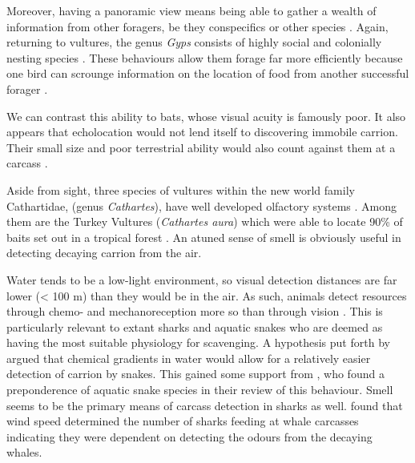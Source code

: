 \documentclass[a4paper,12pt]{article}
\begin{document}
Moreover, having a panoramic view means being able to gather a wealth of information from other foragers, be they conspecifics or other species \citep{jackson2008effect}.
Again, returning to vultures, the genus \textit{Gyps} consists of highly social and colonially nesting species \citep{fernandez2015density}.
These behaviours allow them forage far more efficiently because one bird can scrounge information on the location of food from another successful forager \citep{KaneVul}.

We can contrast this ability to bats, whose visual acuity is famously poor. 
It also appears that echolocation would not lend itself to discovering immobile carrion.
Their small size and poor terrestrial ability would also count against them at a carcass \citep{riskin2006terrestrial}.

Aside from sight, three species of vultures within the new world family Cathartidae, (genus \textit{Cathartes}), have well developed olfactory systems \citep{AR:AR22815}.
Among them are the Turkey Vultures (\textit{Cathartes aura}) which were able to locate 90\% of baits set out in a tropical forest \citep{houston1986olfaction}. An atuned sense of smell is obviously useful in detecting decaying carrion from the air.




Water tends to be a low-light environment, so visual detection distances are far lower (< 100 m) than they would be in the air.
As such, animals detect resources through chemo- and mechanoreception more so than through vision \citep{ruxton2004energetic}.
This is particularly relevant to extant sharks and aquatic snakes who are deemed as having the most suitable physiology for scavenging.
A hypothesis put forth by \cite{sazima1990necrofagia} argued that chemical gradients in water would allow for a relatively easier detection of carrion by snakes.
This gained some support from \cite{devault2002scavenging}, who found a preponderence of aquatic snake species in their review of this behaviour.
Smell seems to be the primary means of carcass detection in sharks as well. 
\cite{fallows2013white} found that wind speed determined the number of sharks feeding at whale carcasses indicating they were dependent on detecting the odours from the decaying whales. 
\end{document}
